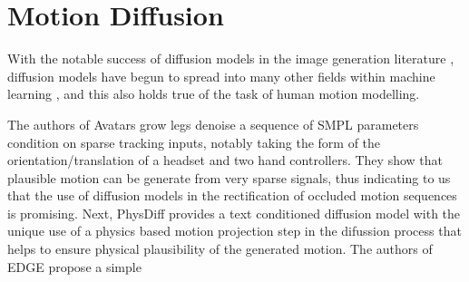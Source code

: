 \section{Motion Diffusion}

With the notable success of diffusion models in the image generation literature \cite{ddpm} \cite{diffusion_beats_gans} \cite{stable_diffusion}, diffusion models have begun to spread into many other fields within machine learning \cite{diffusion_review}, and this also holds true of the task of human motion modelling.

The authors of Avatars grow legs \cite{AvatarsGrowLegs} denoise a sequence of SMPL \cite{SMPL} parameters condition on sparse tracking inputs, notably taking the form of the orientation/translation of a headset and two hand controllers. They show that plausible motion can be generate from very sparse signals, thus indicating to us that the use of diffusion models in the rectification of occluded motion sequences is promising. Next, PhysDiff \cite{PhysDiff} provides a text conditioned diffusion model with the unique use of a physics based motion projection step in the difussion process that helps to ensure physical plausibility of the generated motion. The authors of EDGE \cite{EDGE} propose a simple 
